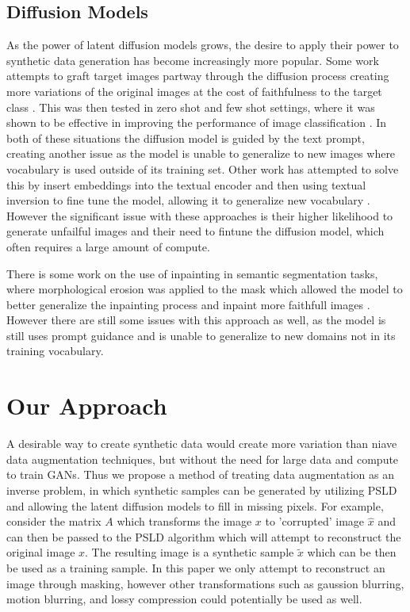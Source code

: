 \documentclass{article}
\begin{document}
\subsection{Diffusion Models}

As the power of latent diffusion models grows, the desire to apply their power to synthetic data generation has become increasingly more popular. Some work
attempts to graft target images partway through the diffusion process creating more variations of the original images at the cost of faithfulness to the target
class \cite{2108.01073}. This was then tested in zero shot and few shot settings, where it was shown to be effective in improving the performance of image 
classification \cite{2210.07574}. In both of these situations the diffusion model is guided by the text prompt, creating another issue as the model is unable to
generalize to new images where vocabulary is used outside of its training set. Other work has attempted to solve this by insert embeddings into the textual encoder
and then using textual inversion to fine tune the model, allowing it to generalize new vocabulary \cite{2302.07944}. However the significant issue with these approaches
is their higher likelihood to generate unfailful images and their need to fintune the diffusion model, which often requires a large amount of compute.

There is some work on the use of inpainting in semantic segmentation tasks, where morphological erosion was applied to the mask which allowed the model to better
generalize the inpainting process and inpaint more faithfull images \cite{Pobitzer_2023}. However there are still some issues with this approach as well,
as the model is still uses prompt guidance and is unable to generalize to new domains not in its training vocabulary.

\section{Our Approach}

A desirable way to create synthetic data would create more variation than niave data augmentation techniques, but without the need for
large data and compute to train GANs. Thus we propose a method of treating data augmentation as an inverse problem, in which synthetic samples
can be generated by utilizing PSLD and allowing the latent diffusion models to fill in missing pixels. For example, consider the matrix $A$ which
transforms the image $x$ to 'corrupted' image $\hat{x}$ and can then be passed to the PSLD algorithm which will attempt to reconstruct
the original image $x$. The resulting image is a synthetic sample $\tilde{x}$ which can be then be used as a training sample. In this paper we
only attempt to reconstruct an image through masking, however other transformations such as gaussion blurring, motion blurring, and lossy compression
could potentially be used as well.
\end{document}
